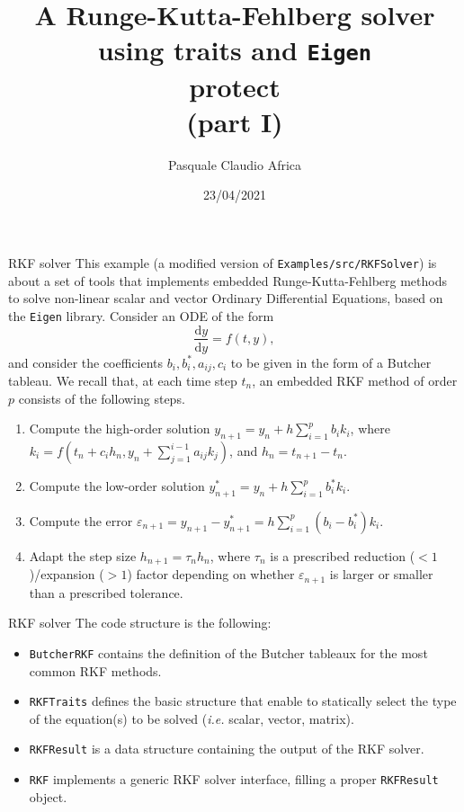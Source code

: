 \documentclass[10pt]{beamer}
\begin{document}
    \title{A Runge-Kutta-Fehlberg solver\protect\\using traits and \texttt{Eigen}\\protect\\(part I)}
    \author{Pasquale Claudio Africa}
    \date{23/04/2021}

\begin{frame}
    \maketitle
\end{frame}

\begin{frame}{RKF solver}
This example (a modified version of \texttt{Examples/src/RKFSolver}) is about a set of tools that implements embedded Runge-Kutta-Fehlberg methods to solve non-linear scalar and vector Ordinary Differential Equations, based on the \texttt{Eigen} library.
\vfill
Consider an ODE of the form
\begin{equation*}
\frac{\mathrm{d} y}{\mathrm{d} y} = f(t, y),
\end{equation*}
and consider the coefficients \(b_i, b_i^*, a_{ij}, c_i\) to be given in the form of a Butcher tableau.
We recall that, at each time step \(t_n\), an embedded RKF method of order \(p\) consists of the following steps.
\begin{enumerate}
\item Compute the high-order solution \(y_{n+1} = y_{n} + h \sum_{i=1}^p b_i k_i\), where \(k_i = f\left(t_n + c_i h_n, y_n + \sum_{j=1}^{i-1}a_{ij}k_j\right)\), and \(h_n = t_{n+1} - t_n\).
\item Compute the low-order solution \(y_{n+1}^* = y_{n} + h \sum_{i=1}^p b_i^* k_i\).
\item Compute the error \(\varepsilon_{n+1} = y_{n+1} - y_{n+1}^* = h\sum_{i=1}^p(b_i - b_i^*)k_i\).
\item Adapt the step size \(h_{n+1} = \tau_{n} h_{n}\), where \(\tau_{n}\) is a prescribed reduction (\(<1\))/expansion (\(>1\)) factor depending on whether \(\varepsilon_{n+1}\) is larger or smaller than a prescribed tolerance.
\end{enumerate}
\end{frame}

\begin{frame}{RKF solver}
The code structure is the following:
\begin{itemize}
\item \texttt{ButcherRKF} contains the definition of the Butcher tableaux for the most common RKF methods.
\item \texttt{RKFTraits} defines the basic structure that enable to statically select the type of the equation(s) to be solved (\textit{i.e.} scalar, vector, matrix).
\item \texttt{RKFResult} is a data structure containing the output of the RKF solver.
\item \texttt{RKF} implements a generic RKF solver interface, filling a proper \texttt{RKFResult} object.
\end{itemize}
\end{frame}
\end{document}
